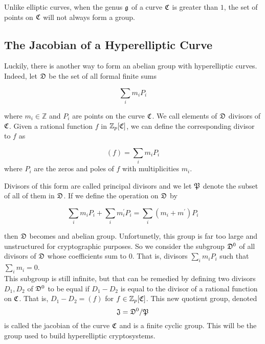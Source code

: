 
Unlike elliptic curves, when the genus $\mathfrak{g}$ of a curve $\mathfrak{C} $ is greater than $1$, the set of points on $\mathfrak{C}$ will not always form a group. 



\subsection{The Jacobian of a Hyperelliptic Curve}

Luckily, there is another way to form an abelian group with hyperelliptic curves. Indeed, let $\mathfrak{D}$ be the set of all formal finite sums 

$$ \sum_i m_i P_i $$ 

where $m_i \in \mathbb{Z}$ and $P_i$ are points on the curve $\mathfrak{C}$. We call elements of $\mathfrak{D}$ divisors of $\mathfrak{C}$. Given a rational function $f$ in $\mathbb{Z}_p[\mathfrak{C}]$, we can define the corresponding divisor to $f$ as

$$(f) = \sum_i m_i P_i $$ where $P_i$ are the zeros and poles of $f$ with multiplicities $m_i$. 


Divisors of this form are called principal divisors and we let $\mathfrak{P}$ denote the subset of all of them in $\mathfrak{D}$. If we define the operation on $\mathfrak{D}$ by 

$$ \sum_i m_i P_i  + \sum_i m^\prime_i P_i  = \sum_i (m_i+m^\prime) P_i $$ 

then $\mathfrak{D}$ becomes and abelian group. Unfortunetly, this group is far too large and unstructured for cryptographic purposes. So we consider the subgroup $\mathfrak{D}^0$ of all divisors of $\mathfrak{D}$ whose coefficients sum to $0$. That is, divisors $ \sum_i m_i P_i $ such that $\sum_i m_i = 0$. \\ 

This subgroup is still infinite, but that can be remedied by defining two divisors $D_1, D_2$ of $\mathfrak{D}^0$ to be equal if $D_1 - D_2$ is equal to the divisor of a rational function on $\mathfrak{C}$. That is, $D_1 - D_2 = (f) $ for $f \in \mathbb{Z}_p[\mathfrak{C}]$. This new quotient group, denoted $$\mathfrak{J} = \mathfrak{D}^0 / \mathfrak{P}$$ is called the jacobian of the curve $\mathfrak{C}$ and is a finite cyclic group. This will be the group used to build hyperelliptic cryptosystems.

